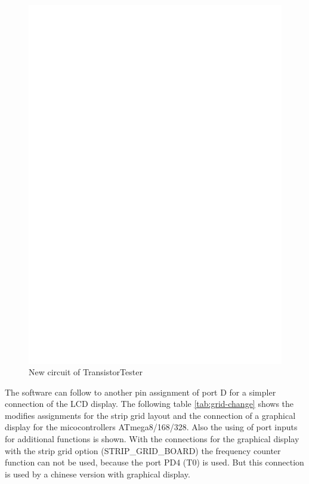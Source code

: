 \begin{figure}[H]
\centering
\includegraphics[width=18cm]{../FIG/ttester.eps}
\caption{New circuit of TransistorTester}
\label{fig:ttester}
\end{figure}
The software can follow to another pin assignment of port D for a simpler connection of the
LCD display. 
The following table \ref{tab:grid-change} shows the modifies assignments for the strip grid layout and
the connection of a graphical display for the micocontrollers ATmega8/168/328.
Also the using of port inputs for additional functions is shown.
With the connections for the graphical display with the strip grid option (STRIP\_GRID\_BOARD)
the frequency counter function can not be used, because the port PD4 (T0) is used.
But this connection is used by a chinese version with graphical display. 



